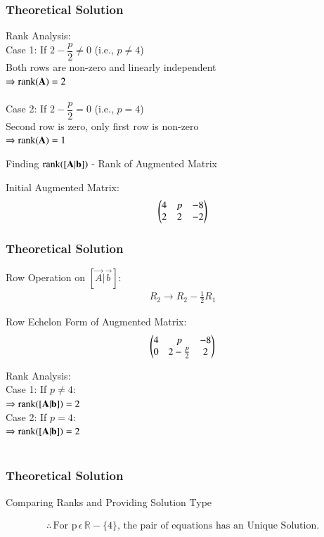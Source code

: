 \documentclass{beamer}
\begin{document}
\begin{frame}[fragile]
    \frametitle{Theoretical Solution}
Rank Analysis:\\
    Case 1: If $ 2 - \dfrac{p}{2} \neq 0 $ (i.e., $ p \neq 4 $)\\
        Both rows are non-zero and linearly independent \\
        $ \Rightarrow \text{rank}(\mathbf{A}) = 2 $\\\\
Case 2: If $ 2 - \dfrac{p}{2} = 0 $ (i.e., $ p = 4 $)\\
        Second row is zero, only first row is non-zero \\
        $ \Rightarrow \text{rank}(\mathbf{A}) = 1 $
\bigskip

Finding $\text{rank}([\mathbf{A}|\mathbf{b}])$ - Rank of Augmented Matrix

Initial Augmented Matrix:
\begin{equation}
\begin{pmatrix}4 & p & -8 \\ 2 & 2 & -2\end{pmatrix}
\end{equation}
\end{frame}

\begin{frame}[fragile]
    \frametitle{Theoretical Solution}
Row Operation on $[\vec{A}|\vec{b}]$:\\ 
\begin{align}
R_2 \to R_2 - \frac{1}{2}R_1
\end{align}

Row Echelon Form of Augmented Matrix:
\begin{equation}
\begin{pmatrix}4 & p & -8 \\ 0 & 2-\frac{p}{2} & 2\end{pmatrix}
\end{equation}

Rank Analysis:\\
Case 1: If $ p \neq 4 $:\\
$\Rightarrow \text{rank}([\mathbf{A}|\mathbf{b}]) = 2$\\

Case 2: If $ p = 4 $:\\
$ \Rightarrow \text{rank}([\mathbf{A}|\mathbf{b}]) = 2 $\\\\
\end{frame}

\begin{frame}[fragile]
    \frametitle{Theoretical Solution}
Comparing Ranks and Providing Solution Type
\begin{center}

\end{center}

\begin{align}
\boxed{\therefore \, \text{For p} \, \epsilon \, \mathbb{R}-\{4\}, \, \text{the pair of equations has an Unique Solution.}}
\end{align}
\end{frame}
\end{document}
